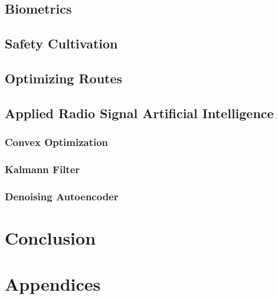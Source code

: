 \documentclass[11pt,twoside]{report}
\begin{document}
\section{Biometrics}
\section{Safety Cultivation}
\section{Optimizing Routes}
\section{Applied Radio Signal Artificial Intelligence}
\subsection{Convex Optimization}
\subsection{Kalmann Filter}
\subsection{Denoising Autoencoder}
\chapter{Conclusion}

\chapter{Appendices}

\newpage
\printbibliography
\end{document}
